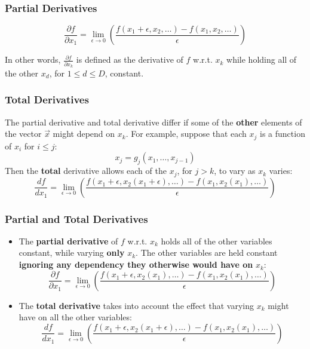 \documentclass{beamer}
\begin{document}
\begin{frame}
  \frametitle{Partial Derivatives}

  \begin{displaymath}
    \frac{\partial f}{\partial x_1} = \lim_{\epsilon\rightarrow 0}\left(
    \frac{f(x_1+\epsilon,x_{2},\ldots)-f(x_1,x_{2},\ldots)}
         {\epsilon}\right)
  \end{displaymath}

  In other words, $\frac{\partial f}{\partial x_k}$ is defined as the
  derivative of $f$ w.r.t. $x_k$ while holding all of the other $x_d$,
  for $1\le d\le D$, constant.
\end{frame}
\begin{frame}
  \frametitle{Total Derivatives}

  The partial derivative and total derivative differ if some of the
  {\bf other} elements of the vector $\vec{x}$ might depend on $x_k$.
  For example, suppose that each $x_j$ is a function of $x_i$ for $i\le j$:
  \begin{displaymath}
    x_j = g_j(x_1,\ldots,x_{j-1})
  \end{displaymath}
  Then the {\bf total} derivative allows each of the $x_j$, for $j>k$,
  to vary as $x_k$ varies:
  \begin{displaymath}
    \frac{d f}{d x_1} = \lim_{\epsilon\rightarrow 0}\left(
    \frac{f(x_1+\epsilon,x_{2}(x_1+\epsilon),\ldots)-
      f(x_1,x_{2}(x_1),\ldots)}{\epsilon}
    \right)
  \end{displaymath}
\end{frame}
  
\begin{frame}
  \frametitle{Partial and Total Derivatives}

  \begin{itemize}
  \item
    The {\bf partial derivative} of $f$ w.r.t. $x_k$ holds all of the
    other variables constant, while varying {\bf only} $x_k$.  The
    other variables are held constant {\bf ignoring any dependency
      they otherwise would have on} $x_k$:
    \begin{displaymath}
    \frac{\partial f}{\partial x_1} = \lim_{\epsilon\rightarrow 0}\left(
    \frac{f(x_1+\epsilon,x_{2}(x_1),\ldots)-
      f(x_1,x_{2}(x_1),\ldots)}{\epsilon}
    \right)
    \end{displaymath}
  \item
    The {\bf total derivative} takes into account the effect that
    varying $x_k$ might have on all the other variables:
    \begin{displaymath}
    \frac{d f}{d x_1} = \lim_{\epsilon\rightarrow 0}\left(
    \frac{f(x_1+\epsilon,x_{2}(x_1+\epsilon),\ldots)-
      f(x_1,x_{2}(x_1),\ldots)}{\epsilon}
    \right)
    \end{displaymath}
  \end{itemize}
\end{frame}
\end{document}
